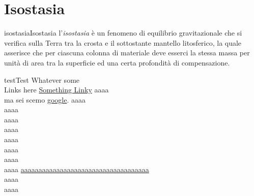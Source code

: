 \documentclass[preview]{standalone}
\begin{document}
\genpage

\section{Isostasia}

\begin{snippetdefinition}{isostasia}{Isostasia}
    l'\textit{isostasia} è un fenomeno di equilibrio gravitazionale
    che si verifica sulla Terra tra la crosta e il sottostante mantello litosferico,
    la quale asserisce che per ciascuna colonna di materiale deve esserci
    la stessa massa per unità di area tra la superficie ed una certa profondità di compensazione.
\end{snippetdefinition}

\begin{snippetdefinition}{test}{Test}
    Whatever some \\
    Links here \href{http://www.overleaf.com}{Something 
    Linky} aaaa \\
    ma sei scemo \href{http://www.google.com}{google}.
    aaaa \\
    aaaa \\
    aaaa \\
    aaaa \\
    aaaa \\
    aaaa \\
    aaaa \\
    aaaa \href{http://www.google.com}{aaaaaaaaaaaaaaaaaaaaaaaaaaaaaaaaaaaa} \\
    aaaa \\
    aaaa \\
\end{snippetdefinition}
\end{document}
